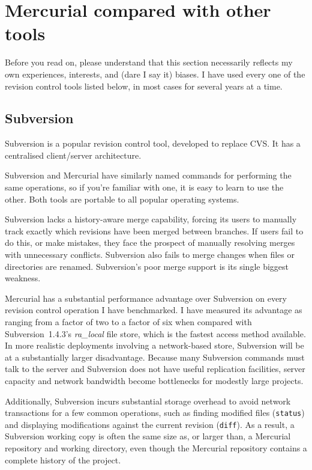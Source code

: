 \section{Mercurial compared with other tools}

Before you read on, please understand that this section necessarily
reflects my own experiences, interests, and (dare I say it) biases.  I
have used every one of the revision control tools listed below, in
most cases for several years at a time.


\subsection{Subversion}

Subversion is a popular revision control tool, developed to replace
CVS.  It has a centralised client/server architecture.

Subversion and Mercurial have similarly named commands for performing
the same operations, so if you're familiar with one, it is easy to
learn to use the other.  Both tools are portable to all popular
operating systems.

Subversion lacks a history-aware merge capability, forcing its users
to manually track exactly which revisions have been merged between
branches.  If users fail to do this, or make mistakes, they face the
prospect of manually resolving merges with unnecessary conflicts.
Subversion also fails to merge changes when files or directories are
renamed.  Subversion's poor merge support is its single biggest
weakness.

Mercurial has a substantial performance advantage over Subversion on
every revision control operation I have benchmarked.  I have measured
its advantage as ranging from a factor of two to a factor of six when
compared with Subversion~1.4.3's \emph{ra\_local} file store, which is
the fastest access method available.  In more realistic deployments
involving a network-based store, Subversion will be at a substantially
larger disadvantage.  Because many Subversion commands must talk to
the server and Subversion does not have useful replication facilities,
server capacity and network bandwidth become bottlenecks for modestly
large projects.

Additionally, Subversion incurs substantial storage overhead to avoid
network transactions for a few common operations, such as finding
modified files (\texttt{status}) and displaying modifications against
the current revision (\texttt{diff}).  As a result, a Subversion
working copy is often the same size as, or larger than, a Mercurial
repository and working directory, even though the Mercurial repository
contains a complete history of the project.

